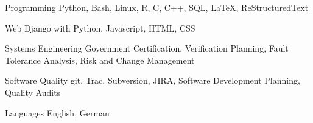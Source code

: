 


\begin{cvskills}


\cvskill
{Programming} %
{Python, Bash, Linux, R, C, C++,
 SQL, \LaTeX, ReStructuredText} %


\cvskill
{Web} %
{Django with Python, Javascript, HTML, CSS} %


\cvskill
{Systems Engineering}
{Government Certification, Verification Planning, Fault Tolerance
 Analysis, Risk and Change Management}

\cvskill
{Software Quality}
{git, Trac, Subversion, JIRA, Software Development Planning, Quality Audits}


\cvskill
{Languages} %
{English, German} %


\end{cvskills}